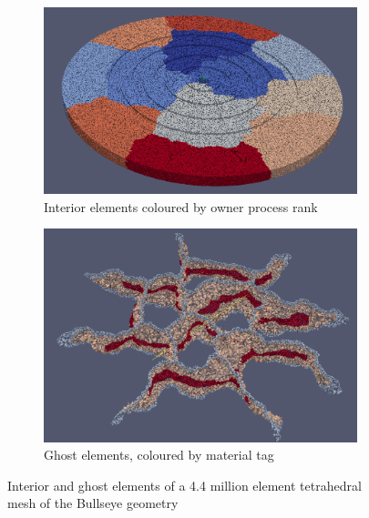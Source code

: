 \begin{figure}[H]
    \centering
	\begin{subfigure}[b]{0.48\textwidth} \includegraphics[scale=0.20]{images/bullseye-core-angle}          \captionsetup{width=0.8\textwidth} \caption{Interior elements coloured by owner process rank}   \end{subfigure}
	\begin{subfigure}[b]{0.48\textwidth} \includegraphics[scale=0.17]{images/bullseye-ghostelements-angle}  \captionsetup{width=0.8\textwidth} \caption{Ghost elements, coloured by material tag} \end{subfigure}
	\caption{Interior and ghost elements of a 4.4 million element tetrahedral mesh of the Bullseye geometry}
	\label{fig:result:bullseye}
\end{figure}

